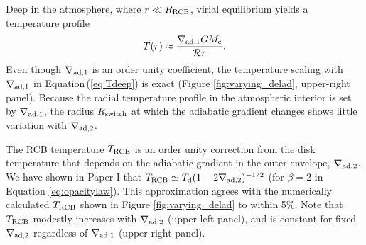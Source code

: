 \documentclass[apj]{emulateapj}
\newcommand{\Eq}[1]{Equation\,(\ref{#1})}
\newcommand{\RB}{R_{\rm B}}
\newcommand{\co}{_{\rm c}}
\newcommand{\di}{_{\rm d}}
\newcommand{\cb}{_{\rm RCB}}
\begin{document}





Deep in the atmosphere, where $r \ll R\cb$, virial equilibrium yields a temperature profile 
\begin{equation}
\label{eq:Tdeep}
T(r) \approx \frac{\nabla_{\rm ad,1} G M\co}{\mathcal{R} r}.
\end{equation}   
Even though $\nabla_{\rm ad,1}$ is an order unity coefficient, the temperature scaling with $\nabla_{\rm ad,1}$ in \Eq{eq:Tdeep} is exact (Figure \ref{fig:varying_delad}, upper-right panel). Because the radial temperature profile in the atmospheric interior is set by $\nabla_{\rm ad,1}$, the radius $R_{\rm switch}$ at which the adiabatic gradient changes shows little variation with $\nabla_{\rm ad,2}$. %


The RCB temperature $T\cb$ is an order unity correction from the disk temperature that depends on the adiabatic gradient in the outer envelope, $\nabla_{\rm ad,2}$.  We have shown in Paper I that $T\cb \simeq T\di (1- 2 \nabla_{\rm ad, 2})^{-1/2}$ (for $\beta=2$ in Equation \ref{eq:opacitylaw}). This approximation agrees with the numerically calculated $T\cb$ shown in Figure \ref{fig:varying_delad} to within 5\%. Note that $T\cb$ modestly increases with $\nabla_{\rm ad,2}$ (upper-left panel), and is constant for fixed $\nabla_{\rm ad,2}$  regardless of $\nabla_{\rm ad,1}$ (upper-right panel).
\end{document}

